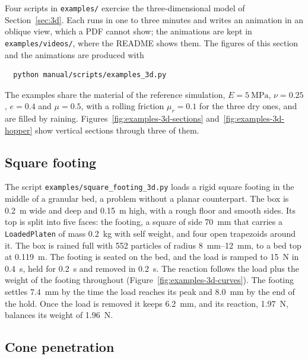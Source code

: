 Four scripts in \texttt{examples/} exercise the three-dimensional model of Section~\ref{sec:3d}.
Each runs in one to three minutes and writes an animation in an oblique view, which a PDF cannot show; the animations are kept in \texttt{examples/videos/}, where the README shows them.
The figures of this section and the animations are produced with
\begin{verbatim}
  python manual/scripts/examples_3d.py
\end{verbatim}
The examples share the material of the reference simulation, $E=\qty{5}{\mega\pascal}$, $\nu=0.25$, $e=0.4$ and $\mu=0.5$, with a rolling friction $\mu_{r}=0.1$ for the three dry ones, and are filled by raining.
Figures~\ref{fig:examples-3d-sections} and~\ref{fig:examples-3d-hopper} show vertical sections through three of them.

\subsection{Square footing}

The script \texttt{examples/square\_footing\_3d.py} loads a rigid square footing in the middle of a granular bed, a problem without a planar counterpart.
The box is \qty{0.2}{\metre} wide and deep and \qty{0.15}{\metre} high, with a rough floor and smooth sides.
Its top is split into five faces: the footing, a square of side \qty{70}{\milli\metre} that carries a \texttt{LoadedPlaten} of mass \qty{0.2}{\kilogram} with self weight, and four open trapezoids around it.
The box is rained full with \num{552} particles of radius \qtyrange{8}{12}{\milli\metre}, to a bed top at \qty{0.119}{\metre}.
The footing is seated on the bed, and the load is ramped to \qty{15}{\newton} in \qty{0.4}{\second}, held for \qty{0.2}{\second} and removed in \qty{0.2}{\second}.
The reaction follows the load plus the weight of the footing throughout (Figure~\ref{fig:examples-3d-curves}).
The footing settles \qty{7.4}{\milli\metre} by the time the load reaches its peak and \qty{8.0}{\milli\metre} by the end of the hold.
Once the load is removed it keeps \qty{6.2}{\milli\metre}, and its reaction, \qty{1.97}{\newton}, balances its weight of \qty{1.96}{\newton}.

\subsection{Cone penetration}

